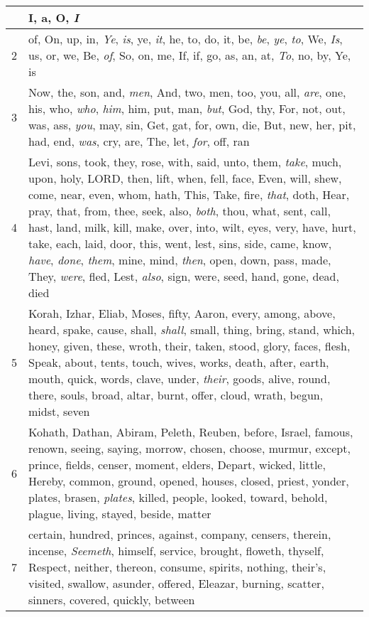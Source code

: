 \begin{longtable}{l|p{3.75in}}
\hline \hline
\endlastfoot
1 & I, a, O, \emph{I} \\ \hline
2 & of, On, up, in, \emph{Ye}, \emph{is}, ye, \emph{it}, he, to, do, it, be, \emph{be}, \emph{ye}, \emph{to}, We, \emph{Is}, us, or, we, Be, \emph{of}, So, on, me, If, if, go, as, an, at, \emph{To}, no, by, Ye, is \\ \hline
3 & Now, the, son, and, \emph{men}, And, two, men, too, you, all, \emph{are}, one, his, who, \emph{who}, \emph{him}, him, put, man, \emph{but}, God, thy, For, not, out, was, ass, \emph{you}, may, sin, Get, gat, for, own, die, But, new, her, pit, had, end, \emph{was}, cry, are, The, let, \emph{for}, off, ran \\ \hline
4 & Levi, sons, took, they, rose, with, said, unto, them, \emph{take}, much, upon, holy, LORD, then, lift, when, fell, face, Even, will, shew, come, near, even, whom, hath, This, Take, fire, \emph{that}, doth, Hear, pray, that, from, thee, seek, also, \emph{both}, thou, what, sent, call, hast, land, milk, kill, make, over, into, wilt, eyes, very, have, hurt, take, each, laid, door, this, went, lest, sins, side, came, know, \emph{have}, \emph{done}, \emph{them}, mine, mind, \emph{then}, open, down, pass, made, They, \emph{were}, fled, Lest, \emph{also}, sign, were, seed, hand, gone, dead, died \\ \hline
5 & Korah, Izhar, Eliab, Moses, fifty, Aaron, every, among, above, heard, spake, cause, shall, \emph{shall}, small, thing, bring, stand, which, honey, given, these, wroth, their, taken, stood, glory, faces, flesh, Speak, about, tents, touch, wives, works, death, after, earth, mouth, quick, words, clave, under, \emph{their}, goods, alive, round, there, souls, broad, altar, burnt, offer, cloud, wrath, begun, midst, seven \\ \hline
6 & Kohath, Dathan, Abiram, Peleth, Reuben, before, Israel, famous, renown, seeing, saying, morrow, chosen, choose, murmur, except, prince, fields, censer, moment, elders, Depart, wicked, little, Hereby, common, ground, opened, houses, closed, priest, yonder, plates, brasen, \emph{plates}, killed, people, looked, toward, behold, plague, living, stayed, beside, matter \\ \hline
7 & certain, hundred, princes, against, company, censers, therein, incense, \emph{Seemeth}, himself, service, brought, floweth, thyself, Respect, neither, thereon, consume, spirits, nothing, their's, visited, swallow, asunder, offered, Eleazar, burning, scatter, sinners, covered, quickly, between \\ \hline

\end{longtable}
